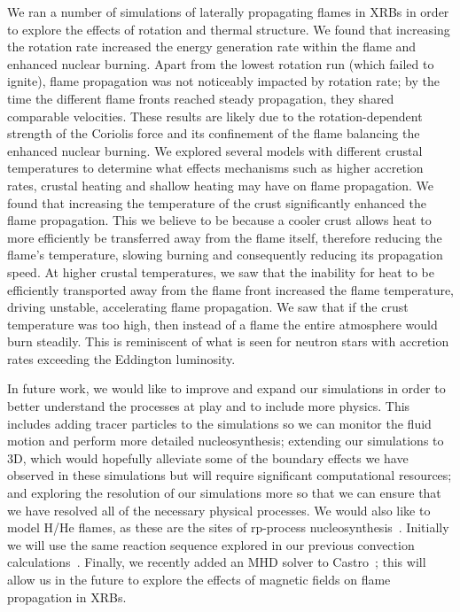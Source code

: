\documentclass[preprint,times,tighten]{aastex63}
\newcommand{\castro}{{\sf Castro}}
\begin{document}
We ran a number of simulations of laterally propagating flames in XRBs in order to explore the effects of rotation and thermal structure. We found that increasing the rotation rate increased the energy generation rate within the flame and enhanced nuclear burning. Apart from the lowest rotation run (which failed to ignite), flame propagation was not noticeably impacted by rotation rate; by the time the different flame fronts reached steady propagation, they shared comparable velocities. These results are likely due to the rotation-dependent strength of the Coriolis force and its confinement of the flame balancing the enhanced nuclear burning. We explored several models with different crustal temperatures to determine what effects mechanisms such as higher accretion rates, crustal heating and shallow heating may have on flame propagation. We found that increasing the temperature of the crust significantly enhanced the flame propagation. This we believe to be because a cooler crust allows heat to more efficiently be transferred away from the flame itself, therefore reducing the flame's temperature, slowing burning and consequently reducing its propagation speed. At higher crustal temperatures, we saw that the inability for heat to be efficiently transported away from the flame front increased the flame temperature, driving unstable, accelerating flame propagation. We saw that if the crust temperature was too high, then instead of a flame the entire atmosphere would burn steadily. This is reminiscent of what is seen for neutron stars with accretion rates exceeding the Eddington luminosity.

In future work, we would like to improve and expand our
simulations in order to better understand the processes at play and to
include more physics. This includes adding tracer particles to the
simulations so we can monitor the fluid motion and perform more
detailed nucleosynthesis; extending our simulations to 3D, which would
hopefully alleviate some of the boundary effects we have observed in
these simulations but will require significant computational resources;
and exploring the resolution of our simulations more so that we can
ensure that we have resolved all of the necessary physical processes. We
would also like to model H/He flames, as these are the sites of
rp-process nucleosynthesis~\citep{rpprocess}.  Initially we will use the same reaction
sequence explored in our previous convection
calculations~\citep{xrb2}.  Finally, we
recently added an MHD solver to \castro~\citep{sazo2020thesis}; this
will allow us in the future to explore the effects of magnetic fields on flame
propagation in XRBs.
\end{document}
